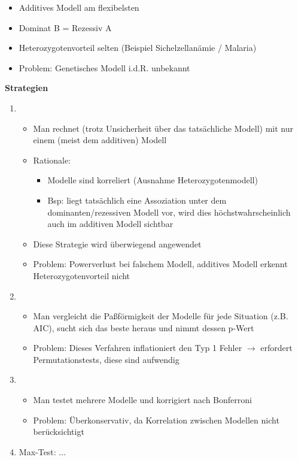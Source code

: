 \begin{itemize}
	\item Additives Modell am flexibelsten
	\item Dominat B = Rezessiv A
	\item Heterozygotenvorteil selten (Beispiel Sichelzellanämie / Malaria)
	\item Problem: Genetisches Modell i.d.R. unbekannt
\end{itemize}

\newpage
\textbf{Strategien}
\begin{enumerate}
	\item 
	\begin{itemize}
		\item Man rechnet (trotz Unsicherheit über das tatsächliche Modell) mit nur einem (meist dem additiven) Modell
		\item Rationale:
		\begin{itemize}
			\item Modelle sind korreliert (Ausnahme Heterozygotenmodell)
			\item Bsp: liegt tatsächlich eine Assoziation unter dem dominanten/rezessiven Modell vor, wird dies höchstwahrscheinlich auch im additiven Modell sichtbar
		\end{itemize}
		\item Diese Strategie wird überwiegend angewendet
		\item Problem: Powerverlust bei falschem Modell, additives Modell erkennt Heterozygotenvorteil nicht
	\end{itemize}
	\item 
	\begin{itemize}
		\item Man vergleicht die Paßförmigkeit der Modelle für jede Situation (z.B. AIC), sucht sich das beste heraus und nimmt dessen p-Wert
		\item Problem: Dieses Verfahren inflationiert den Typ 1 Fehler $\rightarrow$ erfordert Permutationstests, diese sind aufwendig
	\end{itemize}
	\item 
	\begin{itemize}
		\item Man testet mehrere Modelle und korrigiert nach Bonferroni
		\item Problem: Überkonservativ, da Korrelation zwischen Modellen nicht berücksichtigt
	\end{itemize}
	\item Max-Test: ...
\end{enumerate}

